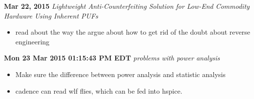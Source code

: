 \documentclass[]{article}
\begin{document}
\noindent \textbf{Mar 22, 2015}
\textit{Lightweight Anti-Counterfeiting Solution for Low-End Commodity Hardware
Using Inherent PUFs}
\indent     \begin{itemize}
            \item read about the way the argue about how to get rid of the doubt
            about reverse engineering
            \end{itemize}

\noindent \textbf{Mon 23 Mar 2015 01:15:43 PM EDT}
\textit{problems with power analysis}
\indent		\begin{itemize}
                \item Make sure the difference between power analysis and statistic
                analysis
                \item cadence can read wlf flies, which can be fed into hspice.
            \end{itemize}
\end{document}
